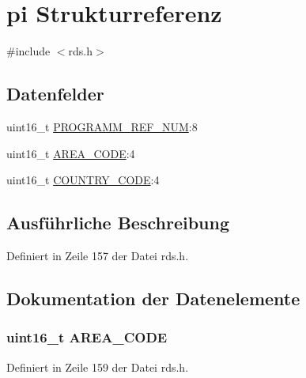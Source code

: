 \hypertarget{structpi}{}\section{pi Strukturreferenz}
\label{structpi}


{\ttfamily \#include $<$rds.\+h$>$}

\subsection*{Datenfelder}
\begin{DoxyCompactItemize}
\item 
uint16\+\_\+t \hyperlink{structpi_aa0995bba54da782b6ff03d66f16e3c57}{P\+R\+O\+G\+R\+A\+M\+M\+\_\+\+R\+E\+F\+\_\+\+N\+U\+M}\+:8
\item 
uint16\+\_\+t \hyperlink{structpi_a71dba196e0ca59278a7cd48f95fd07f3}{A\+R\+E\+A\+\_\+\+C\+O\+D\+E}\+:4
\item 
uint16\+\_\+t \hyperlink{structpi_a104410f64e8aa7ab69f76a5ee53a0a8a}{C\+O\+U\+N\+T\+R\+Y\+\_\+\+C\+O\+D\+E}\+:4
\end{DoxyCompactItemize}


\subsection{Ausführliche Beschreibung}


Definiert in Zeile 157 der Datei rds.\+h.



\subsection{Dokumentation der Datenelemente}
\hypertarget{structpi_a71dba196e0ca59278a7cd48f95fd07f3}{}
\subsubsection[{A\+R\+E\+A\+\_\+\+C\+O\+D\+E}]{\setlength{\rightskip}{0pt plus 5cm}uint16\+\_\+t A\+R\+E\+A\+\_\+\+C\+O\+D\+E}\label{structpi_a71dba196e0ca59278a7cd48f95fd07f3}


Definiert in Zeile 159 der Datei rds.\+h.

\hypertarget{structpi_a104410f64e8aa7ab69f76a5ee53a0a8a}{}
